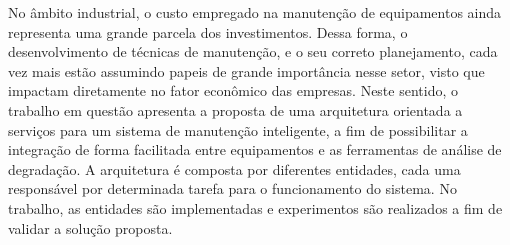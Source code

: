 No âmbito industrial, o custo empregado na manutenção de equipamentos ainda representa uma grande
parcela dos investimentos. Dessa forma, o desenvolvimento de técnicas de manutenção, e o seu correto
planejamento, cada vez mais estão assumindo papeis de grande importância nesse setor, visto que
impactam diretamente no fator econômico das empresas. Neste sentido, o trabalho em questão apresenta
a proposta de uma arquitetura orientada a serviços para um sistema de manutenção inteligente, a fim
de possibilitar a integração de forma facilitada entre equipamentos e as ferramentas de análise de
degradação. A arquitetura é composta por diferentes entidades, cada uma responsável por determinada
tarefa para o funcionamento do sistema. No trabalho, as entidades são implementadas e experimentos
são realizados a fim de validar a solução proposta.
